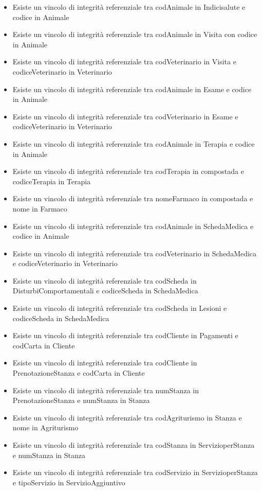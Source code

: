 \documentclass[12pt,a4paper]{article}
\begin{document}
\begin{itemize}
   \item Esiste un vincolo di integrità referenziale tra codAnimale in Indicisalute e codice in Animale
   \item Esiste un vincolo di integrità referenziale tra codAnimale in Visita con codice in Animale
   \item Esiste un vincolo di integrità referenziale tra codVeterinario in Visita e codiceVeterinario in Veterinario
   \item Esiste un vincolo di integrità referenziale tra codAnimale in Esame e codice in Animale
   \item Esiste un vincolo di integrità referenziale tra codVeterinario in Esame e codiceVeterinario in Veterinario
   \item Esiste un vincolo di integrità referenziale tra codAnimale in Terapia e codice in Animale
   \item Esiste un vincolo di integrità referenziale tra codTerapia in compostada e codiceTerapia in Terapia
   \item Esiste un vincolo di integrità referenziale tra nomeFarmaco in compostada e nome in Farmaco
   \item Esiste un vincolo di integrità referenziale tra codAnimale in SchedaMedica e codice in Animale
   \item Esiste un vincolo di integrità referenziale tra codVeterinario in SchedaMedica e codiceVeterinario in Veterinario
   \item Esiste un vincolo di integrità referenziale tra codScheda in DisturbiComportamentali e codiceScheda in SchedaMedica
   \item Esiste un vincolo di integrità referenziale tra codScheda in Lesioni e codiceScheda in SchedaMedica
   \item Esiste un vincolo di integrità referenziale tra codCliente in Pagamenti e codCarta in Cliente
   \item Esiste un vincolo di integrità referenziale tra codCliente in PrenotazioneStanza e codCarta in Cliente
   \item Esiste un vincolo di integrità referenziale tra numStanza in PrenotazioneStanza e numStanza in Stanza
   \item Esiste un vincolo di integrità referenziale tra codAgriturismo in Stanza e nome in Agriturismo
   \item Esiste un vincolo di integrità referenziale tra codStanza in ServizioperStanza e numStanza in Stanza
   \item Esiste un vincolo di integrità referenziale tra codServizio in ServizioperStanza e tipoServizio in ServizioAggiuntivo

\end{itemize}
\end{document}
